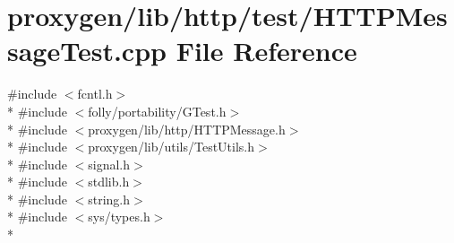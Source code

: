 \section{proxygen/lib/http/test/\+H\+T\+T\+P\+Message\+Test.cpp File Reference}
\label{HTTPMessageTest_8cpp}
{\ttfamily \#include $<$fcntl.\+h$>$}\\*
{\ttfamily \#include $<$folly/portability/\+G\+Test.\+h$>$}\\*
{\ttfamily \#include $<$proxygen/lib/http/\+H\+T\+T\+P\+Message.\+h$>$}\\*
{\ttfamily \#include $<$proxygen/lib/utils/\+Test\+Utils.\+h$>$}\\*
{\ttfamily \#include $<$signal.\+h$>$}\\*
{\ttfamily \#include $<$stdlib.\+h$>$}\\*
{\ttfamily \#include $<$string.\+h$>$}\\*
{\ttfamily \#include $<$sys/types.\+h$>$}\\*

